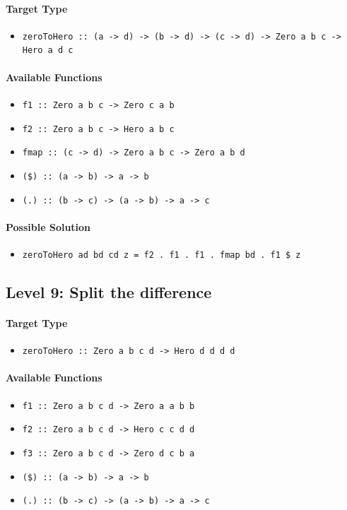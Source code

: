 \documentclass[preprint,12pt]{elsarticle}
\begin{document}
\paragraph{Target Type } 
\begin{itemize}
    \item \texttt{zeroToHero :: (a -> d) -> (b -> d) -> (c -> d) -> Zero a b c ->  Hero a d c}
\end{itemize}

\paragraph{Available Functions} 
\begin{itemize}
    \item \texttt{f1 :: Zero a b c -> Zero c a b}
    \item \texttt{f2 :: Zero a b c -> Hero a b c}
    \item \texttt{fmap :: (c -> d) -> Zero a b c -> Zero a b d}
    \item \texttt{(\$) :: (a -> b) -> a -> b}
    \item \texttt{(.) :: (b -> c) -> (a -> b) -> a -> c}
\end{itemize}

\paragraph{Possible Solution} 
\begin{itemize}
    \item \texttt{zeroToHero ad bd cd z = f2  . f1  . f1  . fmap bd  . f1 \$ z}
\end{itemize}

\subsection{Level 9: Split the difference}
\paragraph{Target Type } 
\begin{itemize}
    \item \texttt{zeroToHero :: Zero a b c d ->  Hero d d d d}
\end{itemize}

\paragraph{Available Functions} 
\begin{itemize}
    \item \texttt{f1 :: Zero a b c d -> Zero a a b b}
    \item \texttt{f2 :: Zero a b c d -> Hero c c d d}
    \item \texttt{f3 :: Zero a b c d -> Zero d c b a}
    \item \texttt{(\$) :: (a -> b) -> a -> b}
    \item \texttt{(.) :: (b -> c) -> (a -> b) -> a -> c}
\end{itemize}
\end{document}
